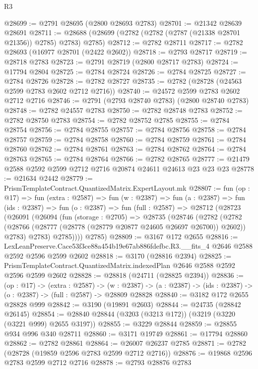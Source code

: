 \begin{lexlean}{R3}
\begin{coremodule}
@28699 := @2791 @28695 (@2800 @28693 @2783)
@28701 := @21342 @28639 @28691
@28711 := @28688 (@28699 (@2782 (@2782 (@2787 (@21338 @28701 @21356)) @2785) @2783) @2785)
@28712 := @2782 @28711
@28717 := @2782 @28693 (@16977 @28701 (@2422 @2602))
@28718 := @2793 @28717
@28719 := @28718 @2783
@28723 := @2791 @28719 (@2800 @28717 @2783)
@28724 := @17794 @2804
@28725 := @2784 @28724
@28726 := @2784 @28725
@28727 := @2784 @28726
@28728 := @2782 @28727
@28735 := @2782 (@28728 (@24563 @2599 @2783 @2602 @2712 @2716))
@28740 := @24572 @2599 @2783 @2602 @2712 @2716
@28746 := @2791 (@2793 @28740 @2783) (@2800 @28740 @2783)
@28748 := @2782 @24557 @2783
@28750 := @2782 @28748 @2783
@28752 := @2782 @28750 @2783
@28754 := @2782 @28752 @2785
@28755 := @2784 @28754
@28756 := @2784 @28755
@28757 := @2784 @28756
@28758 := @2784 @28757
@28759 := @2784 @28758
@28760 := @2784 @28759
@28761 := @2784 @28760
@28762 := @2784 @28761
@28763 := @2784 @28762
@28764 := @2784 @28763
@28765 := @2784 @28764
@28766 := @2782 @28765
@28777 := @21479 @2588 @2592 @2599 @2712 @2716 @20874 @24611 @24613 @23 @23 @23
@28778 := @21634 @2442
@28779 := PrismTemplateContract.QuantizedMatrix.ExpertLayout.mk
@28807 := fun (op : @17) =>
  fun (extra : @2587) =>
  fun (w : @2387) =>
  fun (a : @2387) =>
  fun (ids : @2387) =>
  fun (o : @2387) =>
  fun (full : @2587) =>
  @28712
    (@28723
      (@26091
        (@26094
          (fun (storage : @2705) =>
          @28735
            (@28746
              (@2782
                (@2782 (@28766 (@28777 (@28778 (@28779 @20877 @24605 @26697 @26700)) @2602)) @2783)
                @2783)
              @2785))))
      @2785)
@28809 := @3167 @172 @2655
@28816 := LexLeanPreserve.Cace53f3ce88a454b19e67ab886fdefbc.R3.__fits_4
    @2646
    @2588
    @2592
    @2596
    @2599
    @2602
@28818 := @3170 (@28816 @2394)
@28825 := PrismTemplateContract.QuantizedMatrix.indexedPlan @2646 @2588 @2592 @2596 @2599 @2602
@28828 := @28818 (@24711 (@28825 @2394))
@28836 := (op : @17) ->
  (extra : @2587) ->
  (w : @2387) -> (a : @2387) -> (ids : @2387) -> (o : @2387) -> (full : @2587) -> @28809 @28828
@28840 := @3182 @172 @2655 @28828 @999
@28842 := @3190 (@19891 @2603)
@28844 := @24735 (@28842 @26145)
@28854 := @28840 @28844 (@3203 (@3213 @172)) (@3219 (@3220 (@3221 @999) @2655 @3197))
@28855 := @3229 @28844
@28859 := @28855 @934 @996 @340 @28711
@28860 := @3171 @19749
@28861 := @17794 @28860
@28862 := @2782 @28861
@28864 := @26007 @26237 @2785
@28871 := @2782 (@28728 (@19859 @2596 @2783 @2599 @2712 @2716))
@28876 := @19868 @2596 @2783 @2599 @2712 @2716
@28878 := @2793 @28876 @2783

\end{coremodule}
\end{lexlean}
